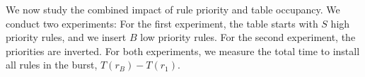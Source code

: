 %


We now study the combined impact of rule priority and table occupancy.
We conduct two experiments: For the first experiment, the table starts with
$S$ high priority rules, and we insert $B$ low priority rules.  For the
second experiment, the priorities are inverted.
For both experiments, we measure the total time to install all rules in the
burst, $T(r_B)-T(r_1)$.


